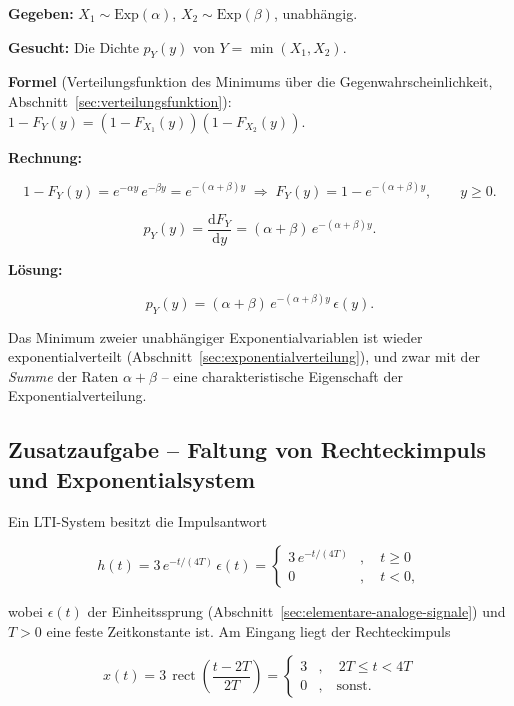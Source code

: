 \begin{beispiel}[Funktion zweier Zufallsvariablen -- $Y = \min(X_1, X_2)$]

\textbf{Gegeben:} $X_1 \sim \text{Exp}(\alpha)$, $X_2 \sim \text{Exp}(\beta)$,
unabhängig.

\textbf{Gesucht:} Die Dichte $p_Y(y)$ von $Y = \min(X_1, X_2)$.

\textbf{Formel} (Verteilungsfunktion des Minimums über die Gegenwahrschein\-lichkeit,
Abschnitt~\ref{sec:verteilungsfunktion}):
$1 - F_Y(y) = \left(1 - F_{X_1}(y)\right)\left(1 - F_{X_2}(y)\right)$.

\textbf{Rechnung:}

$$
1 - F_Y(y) = e^{-\alpha y}\, e^{-\beta y} = e^{-(\alpha+\beta)y}
\;\Rightarrow\; F_Y(y) = 1 - e^{-(\alpha+\beta)y}, \qquad y \geq 0.
$$

$$
p_Y(y) = \frac{\mathrm{d}F_Y}{\mathrm{d}y} = (\alpha+\beta)\, e^{-(\alpha+\beta)y}.
$$

\textbf{Lösung:}

$$
\boxed{\;p_Y(y) = (\alpha+\beta)\, e^{-(\alpha+\beta) y}\,\epsilon(y).\;}
$$

Das Minimum zweier unabhängiger Exponentialvariablen ist wieder
exponentialverteilt (Abschnitt~\ref{sec:exponentialverteilung}), und zwar mit
der \emph{Summe} der Raten $\alpha + \beta$ -- eine charakteristische
Eigenschaft der Exponentialverteilung.

\end{beispiel}

\subsection*{Zusatzaufgabe – Faltung von Rechteckimpuls und Exponentialsystem}

Ein LTI-System besitzt die Impulsantwort

$$
h(t) = 3\, e^{-t/(4T)}\, \epsilon(t)
= \begin{cases} 3\, e^{-t/(4T)} & , \quad t \geq 0 \\[2pt] 0 & , \quad t < 0, \end{cases}
$$

wobei $\epsilon(t)$ der Einheitssprung (Abschnitt~\ref{sec:elementare-analoge-signale})
und $T > 0$ eine feste Zeitkonstante ist. Am Eingang liegt der Rechteckimpuls

$$
x(t) = 3\, \operatorname{rect}\!\left(\frac{t - 2T}{2T}\right)
= \begin{cases} 3 & , \quad 2T \leq t < 4T \\[2pt] 0 & , \quad \text{sonst.} \end{cases}
$$

